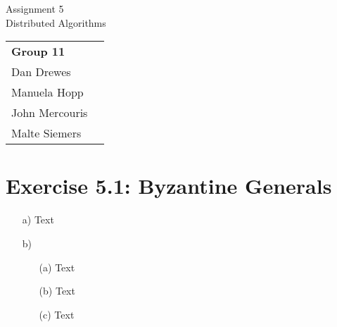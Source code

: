 \documentclass[12pt,a4paper]{article}
\begin{document}
\begin{center}
  \Large Assignment 5 \\
  \large Distributed Algorithms
\end{center}
\begin{flushright}
  \begin{tabular}{ll}
    \textbf{Group 11} \\
    Dan Drewes        \\ 
    Manuela Hopp      \\ 
    John Mercouris    \\
    Malte Siemers     \\
  \end{tabular} 
\end{flushright}



\section*{Exercise 5.1: Byzantine Generals}
\begin{enumerate}
\item[a)] Text
\item[b)]
  \begin{enumerate}
  \item[(a)] Text
  \item[(b)] Text
  \item[(c)] Text
  \end{enumerate}
\end{enumerate}
\end{document}
